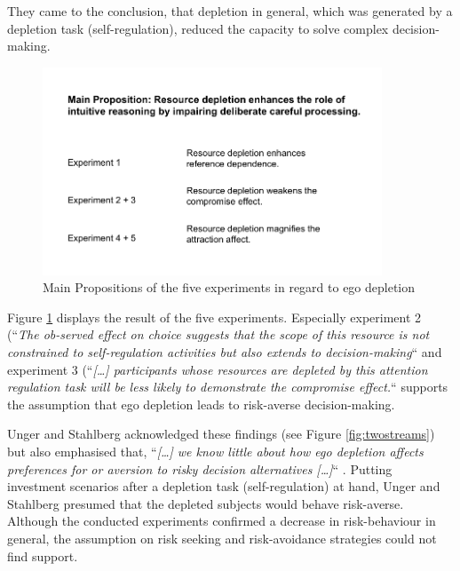 They came to the conclusion, that depletion in general, which was generated by a depletion task (self-regulation), reduced the capacity to solve complex decision-making.\par
\begin{figure}[h!]
	\includegraphics[width=0.9\textwidth]{images/mainpropositions.png}
  \caption{Main Propositions of the five experiments in regard to ego depletion \citep{pocheptsova2009deciding}}\label{fig:mainpropositions}
\end{figure}
Figure \ref{fig:mainpropositions} displays the result of the five experiments. Especially experiment 2 (“\emph{The ob-served effect on choice suggests that the scope of this resource is not constrained to self-regulation activities but also extends to decision-making}“ \citep[p.~350]{pocheptsova2009deciding} and experiment 3 (“\emph{[\ldots] participants whose resources are depleted by this attention regulation task will be less likely to demonstrate the compromise effect.}“ \citep[p.~350]{pocheptsova2009deciding} supports the assumption that ego depletion leads to risk-averse decision-making.\par
Unger and Stahlberg acknowledged these findings (see Figure \ref{fig:twostreams}) but also emphasised that, “\emph{[\ldots] we know little about how ego depletion affects preferences for or aversion to risky decision alternatives [\ldots]}“ \citep[p.~29]{unger2011ego}. Putting investment scenarios after a depletion task (self-regulation) at hand, Unger and Stahlberg presumed that the depleted subjects would behave risk-averse. Although the conducted experiments confirmed a decrease in risk-behaviour in general, the assumption on risk seeking and risk-avoidance strategies could not find support. 

